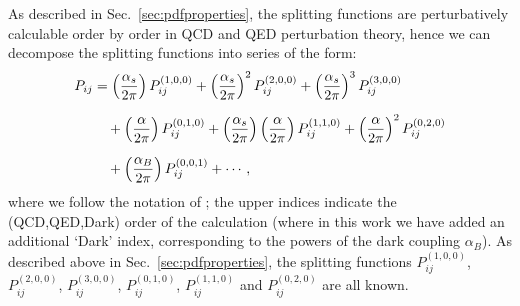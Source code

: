 \documentclass[withindex,glossary]{cam-thesis}
\begin{document}
As described in Sec.~\ref{sec:pdfproperties}, the splitting functions are perturbatively calculable order by order in QCD and QED perturbation theory, hence we can decompose the splitting functions into series of the form:
\begin{align}
\label{eq:splittingexpansion}
P_{ij} &= \left( \frac{\alpha_s}{2\pi} \right) P_{ij}^{(1,0,0)} + \left( \frac{\alpha_s}{2\pi} \right)^2 P_{ij}^{(2,0,0)} + \left(\frac{\alpha_s}{2\pi}\right)^3 P_{ij}^{(3,0,0)} \notag\\[1.5ex]
&\quad+ \left( \frac{\alpha}{2\pi} \right) P_{ij}^{(0,1,0)} + \left( \frac{\alpha_s}{2\pi} \right) \left( \frac{\alpha}{2\pi} \right) P_{ij}^{(1,1,0)} + \left( \frac{\alpha}{2\pi} \right)^2 P_{ij}^{(0,2,0)} \\[1.5ex]
&\quad+ \left( \frac{\alpha_B}{2\pi} \right) P_{ij}^{(0,0,1)} + \cdots, \notag
\end{align}
where we follow the notation of \cite{deFlorian:2015ujt,deFlorian:2016gvk}; the upper indices indicate
the (QCD,QED,Dark) order of the calculation (where in this work we have added an additional `Dark' index, corresponding
to the powers of the dark coupling $\alpha_B$). As described above in Sec.~\ref{sec:pdfproperties}, the splitting functions $P_{ij}^{(1,0,0)}$, $P_{ij}^{(2,0,0)}$, $P_{ij}^{(3,0,0)}$, $P_{ij}^{(0,1,0)}$, $P_{ij}^{(1,1,0)}$ and $P_{ij}^{(0,2,0)}$ are all known.
\end{document}
